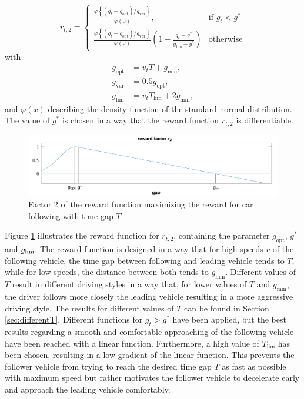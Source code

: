 \documentclass[review]{elsarticle}
\providecommand{\martinc}[1]{}                  %
\providecommand{\sub}[1]{_{\mathrm{#1}}}  %
\providecommand{\3}{{\ss}}
\begin{document}
	
	\begin{equation}
	\label{eq:r2_CFP}
	r_{t,2}  = 
	\begin{cases}
	\frac{\varphi\left\{(g_t-g\sub{opt})/g\sub{var}\right\}}{\varphi(0)}, & \text{if } g_t < g^*\\
	\frac{\varphi\left\{(g_t-g\sub{opt})/g\sub{var}\right\}}{\varphi(0)}\left(1-\frac{g_t-g^*}{g\sub{lim} - g^*}\right)  & \text{otherwise}
	\end{cases}
	\end{equation}
	with 
	\begin{align}
	g\sub{opt} &= v_tT + g\sub{min},\\
	g\sub{var} &= 0.5g\sub{opt},\\
	g\sub{lim} &= v_tT\sub{lim} + 2g\sub{min},
	\end{align}
	and $\varphi(x)$ describing the density function of the standard normal distribution. The value of $g^*$ is chosen in a way that the reward function $r_{t,2}$ is differentiable.
	\begin{figure}
		\centering
		\includegraphics[width=12cm]{images/RewardFunc1}
		\caption{Factor 2 of the reward function maximizing the reward
			for car following with time gap $T$} 
		\label{fig:RewardFunc1}
	\end{figure}
	Figure \ref{fig:RewardFunc1} illustrates the reward function for
	$r_{t,2}$, containing the parameter $g\sub{opt}$, $g^*$ and $g_{\rm
		lim}$. The reward function is designed in a way that for high speeds $v$
	of the following vehicle, the time gap between following and leading
	vehicle tends to $T$, while for low speeds, the distance
	between both tends to $g\sub{min}$. Different values of $T$
	result in different driving styles in a way that, for lower values of
	$T$ and $g\sub{min}$, the driver follows
	more closely the leading vehicle resulting in a more aggressive
	driving style. The results for different values of $T$ can
	be found in Section \ref{sec:differentT}. Different functions for $g_t
	> g^*$ have been applied, but the best results regarding a smooth and
	comfortable approaching of the following vehicle have been reached with
	a linear function. Furthermore, a high value of $T\sub{lim}$ has been
	chosen, resulting in a low gradient of the linear function. This
	prevents the follower vehicle from trying to reach the desired time gap $T$
	as fast as possible with maximum speed \martinc{maximal
		speed: sehr hohe Geschwindigkeit; maximum speed: maximale
		Geschwindigkeit, also $v\sub{des}$. Ich glaube, Letzteres ist hier gemeint.}but rather motivates the follower vehicle to decelerate early and approach the leading vehicle comfortably.
	
\end{document}
